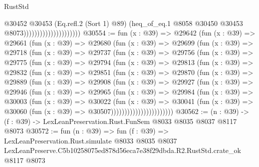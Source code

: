 \begin{lexlean}{RustStd}
\begin{coremodule}
                                          @30452
                                            @30453
                                            (Eq.refl.{2} (Sort 1) @89)
                                            (heq_of_eq.{1}
                                              @8058
                                              @30450
                                              @30453
                                              @8073)))))))))))))))))))))
@30554 := fun (x : @39) =>
  @29642
    (fun (x : @39) =>
    @29661
      (fun (x : @39) =>
      @29680
        (fun (x : @39) =>
        @29699
          (fun (x : @39) =>
          @29718
            (fun (x : @39) =>
            @29737
              (fun (x : @39) =>
              @29756
                (fun (x : @39) =>
                @29775
                  (fun (x : @39) =>
                  @29794
                    (fun (x : @39) =>
                    @29813
                      (fun (x : @39) =>
                      @29832
                        (fun (x : @39) =>
                        @29851
                          (fun (x : @39) =>
                          @29870
                            (fun (x : @39) =>
                            @29889
                              (fun (x : @39) =>
                              @29908
                                (fun (x : @39) =>
                                @29927
                                  (fun (x : @39) =>
                                  @29946
                                    (fun (x : @39) =>
                                    @29965
                                      (fun (x : @39) =>
                                      @29984
                                        (fun (x : @39) =>
                                        @30003
                                          (fun (x : @39) =>
                                          @30022
                                            (fun (x : @39) =>
                                            @30041
                                              (fun (x : @39) =>
                                              @30060 (fun (x : @39) => @30507)))))))))))))))))))))))
@30562 := (n : @39) -> (f : @39) -> LexLeanPreservation.Rust.FunSem @8033 @8035 @8037 @8117 @8073
@30572 := fun (n : @39) =>
  fun (f : @39) =>
  LexLeanPreservation.Rust.simulate
    @8033
    @8035
    @8037
    LexLeanPreserve.C5b10258075ed878d56eca7e38f29dbda.R2.RustStd.crate_ok
    @8117
    @8073
\end{coremodule}
\end{lexlean}
